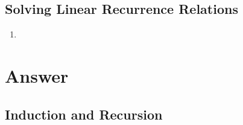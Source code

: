 \documentclass{../../cls/sig-alternate-05-2015}
\begin{document}
\subsection{Solving Linear Recurrence Relations}
\begin{enumerate}
\item 
\end{enumerate}

\nocite{*}

 
\clearpage
\appendix
\section{Answer}
\subsection{Induction and Recursion}
\end{document}
